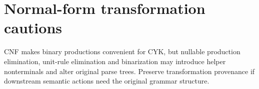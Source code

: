 \documentclass[11pt,letterpaper]{article}
\begin{document}
\section{Normal-form transformation cautions}
CNF makes binary productions convenient for CYK, but nullable production elimination, unit-rule elimination and binarization may introduce helper nonterminals and alter original parse trees. Preserve transformation provenance if downstream semantic actions need the original grammar structure.
\end{document}
